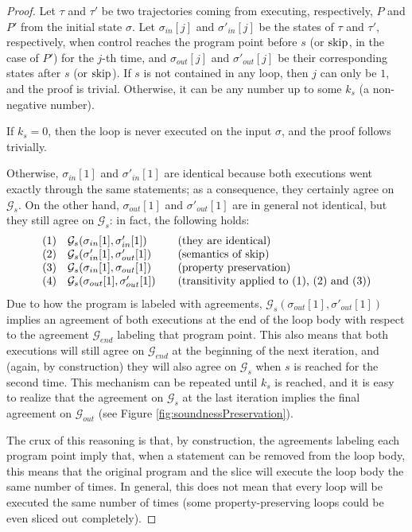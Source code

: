\documentclass[prodmode,acmtocl]{acmsmall}
\def\prog{\ensuremath{P}\xspace}
\def\state{\ensuremath{\sigma}\xspace}
\def\trace{\ensuremath{\tau}\xspace}
\newcommand{\0}{\mbox{\bf 0}}
\newcommand{\CODE}[1]{\ensuremath{\mbox{\lstinline!#1!}\xspace}\xspace}
\def\AGREEM{\mathcal{G}}
\begin{document}
\begin{proof}
  Let $\trace$ and $\trace'$ be two trajectories coming from
  executing, respectively, $\prog$ and $\prog'$ from the initial state
  $\state$.  Let $\state_{in}[j]$ and $\state'_{in}[j]$ be the states
  of $\trace$ and $\trace'$, respectively, when control reaches the
  program point before $s$ (or \CODE{skip}, in the case of $\prog'$)
  for the $j$-th time, and $\state_{out}[j]$ and $\state'_{out}[j]$ be
  their corresponding states after $s$ (or \CODE{skip}).  If $s$ is
  not contained in any loop, then $j$ can only be $1$, and the proof
  is trivial.  Otherwise, it can be any number up to some $k_s$ (a
  non-negative number).

  If $k_s = 0$, then the loop is never executed on the input $\state$,
  and the proof follows trivially.

  Otherwise, $\state_{in}[1]$ and $\state'_{in}[1]$ are identical
  because both executions went exactly through the same statements; as
  a consequence, they certainly agree on $\AGREEM_s$.  On the other
  hand, $\state_{out}[1]$ and $\state'_{out}[1]$ are in general not
  identical, but they still agree on $\AGREEM_s$: in fact, the
  following holds:
  \[ \begin{array}{cl@{\qquad}l}
    (1) & \AGREEM_s(\state_{in}[1],\state'_{in}[1]) & \mbox{(they are
      identical)} \\
    (2) & \AGREEM_s(\state'_{in}[1],\state'_{out}[1]) &
    \mbox{(semantics of \CODE{skip})}
    \\ (3) & \AGREEM_s(\state_{in}[1],\state_{out}[1]) & \mbox{(property
      preservation)} \\ (4) &
    \AGREEM_s(\state_{out}[1],\state'_{out}[1]) &
    \mbox{(transitivity applied to (1), (2) and (3))}
  \end{array} \]
  Due to how the program is labeled with agreements,
  $\AGREEM_s(\state_{out}[1],\state'_{out}[1])$ implies an agreement
  of both executions at the end of the loop body with respect to the
  agreement $\AGREEM_{end}$ labeling that program point.  This also
  means that both executions will still agree on $\AGREEM_{end}$ at
  the beginning of the next iteration, and (again, by construction)
  they will also agree on $\AGREEM_s$ when $s$ is reached for the
  second time.  This mechanism can be repeated until $k_s$ is reached,
  and it is easy to realize that the agreement on $\AGREEM_s$ at the
  last iteration implies the final agreement on $\AGREEM_{out}$ (see
  Figure \ref{fig:soundnessPreservation}).

  The crux of this reasoning is that, by construction, the agreements
  labeling each program point imply that, when a statement can be
  removed from the loop body, this means that the original program and
  the slice will execute the loop body the same number of times.  In
  general, this does not mean that every loop will be executed the
  same number of times (some property-preserving loops could be even
  sliced out completely).
\end{proof}
\end{document}
